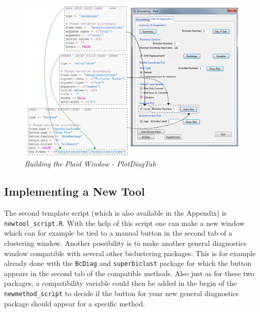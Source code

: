 \documentclass[a4paper]{article}\usepackage[]{graphicx}\usepackage[]{color}
\begin{document}
\begin{figure}[H]
\centering
\includegraphics[scale=0.44]{figures/plaid_plotdiagbuild.png}
\caption{{\it Building the Plaid Window - PlotDiagTab}
\label{plaid_plotdiagbuild}}
\end{figure}


\subsection{Implementing a New Tool}
\noindent The second template script (which is also available in the Appendix)
is \verb|newtool_script.R|. With the help of this script one can make a new window
which can for example be tied to a manual button in the second tab of a
clustering window. Another possibility is to make another general diagnostics
window compatible with several other biclustering packages. This is for example
already done with the \verb|BcDiag| and \verb|superbiclust| package for which
the button appears in the second tab of the compatible methods.
Also just as for these two packages, a compatibility variable could then be
added in the begin of the \verb|newmethod_script| to decide if the button for your new
general diagnostics package should appear for a specific method.
\end{document}
